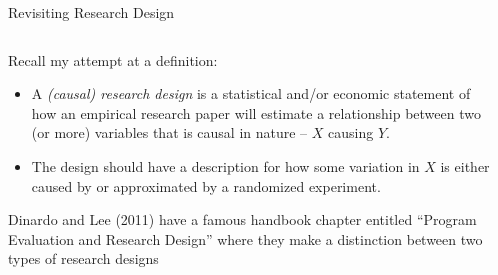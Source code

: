 \documentclass[notes,11pt, aspectratio=169]{beamer}
\newenvironment{wideitemize}{\itemize\addtolength{\itemsep}{10pt}}{\enditemize}
\begin{document}
\begin{frame}{Revisiting Research Design}
  \begin{columns}[T] %
    \begin{column}{0.5\textwidth}
      \begin{wideitemize}
      \item<1-> Recall my attempt at a definition:
        \begin{itemize}
        \item A \emph{(causal) research design} is a statistical
          and/or economic statement of how an empirical research paper
          will estimate a relationship between two (or more) variables
          that is causal in nature -- $X$ causing $Y$.
        \item The design should have a description for how some
          variation in $X$ is either caused by or approximated by a
          randomized experiment.
        \end{itemize}
      \item<2> Dinardo and Lee (2011) have a famous handbook chapter
        entitled ``Program Evaluation and Research Design'' where they
        make a distinction between two types of research designs
      \end{wideitemize}
    \end{column}%
    \hfill%
    \begin{column}{.5\textwidth}
    \end{column}%
  \end{columns}
\end{frame}
\end{document}
